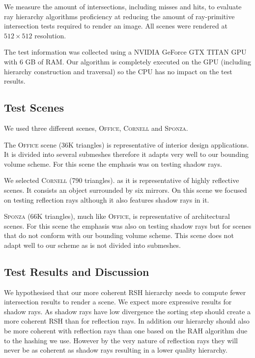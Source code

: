 \documentclass{egpubl}
\begin{document}
We measure the amount of intersections, including misses and hits, to evaluate ray hierarchy algorithms proficiency at reducing the amount of ray-primitive intersection tests required to render an image. All scenes were rendered at $512\times512$ resolution.

The test information was collected using a NVIDIA GeForce GTX TITAN GPU with 6 GB of RAM. Our algorithm is completely executed on the GPU (including hierarchy construction and traversal) so the CPU has no impact on the test results.

\subsection{Test Scenes}

We used three different scenes, \textsc{Office}, \textsc{Cornell} and \textsc{Sponza}.

The \textsc{Office} scene (36K triangles) is representative of interior design applications. It is divided into several submeshes therefore it adapts very well to our bounding volume scheme. For this scene the emphasis was on testing shadow rays. 

We selected \textsc{Cornell} (790 triangles). as it is representative of highly reflective scenes. It consists an object surrounded by six mirrors. On this scene we focused on testing reflection rays although it also features shadow rays in it.

\textsc{Sponza} (66K triangles), much like \textsc{Office}, is representative of architectural scenes. For this scene the emphasis was also on testing shadow rays but for scenes that do not conform with our bounding volume scheme. This scene does not adapt well to our scheme as is not divided into submeshes. 

\subsection{Test Results and Discussion}

We hypothesised that our more coherent RSH hierarchy needs to compute fewer intersection results to render a scene. We expect more expressive results for shadow rays. As shadow rays have low divergence the sorting step should create a more coherent RSH than for reflection rays. In addition our hierarchy should also be more coherent with reflection rays than one based on the RAH algorithm due to the hashing we use. However by the very nature of reflection rays they will never be as coherent as shadow rays resulting in a lower quality hierarchy.
\end{document}
